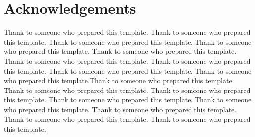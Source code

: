 \chapter*{Acknowledgements}
Thank to someone who prepared this template. Thank to someone who
prepared this template. Thank to someone who prepared this template.
Thank to someone who prepared this template. Thank to someone who
prepared this template. Thank to someone who prepared this template.
Thank to someone who prepared this template. Thank to someone who
prepared this template. Thank to someone who prepared this
template.Thank to someone who prepared this template. Thank to someone
who prepared this template. Thank to someone who prepared this
template. Thank to someone who prepared this template. Thank to
someone who prepared this template. Thank to someone who prepared this
template. Thank to someone who prepared this template. Thank to
someone who prepared this template.

\tableofcontents
\listoffigures
\listoftables
\clearpage











